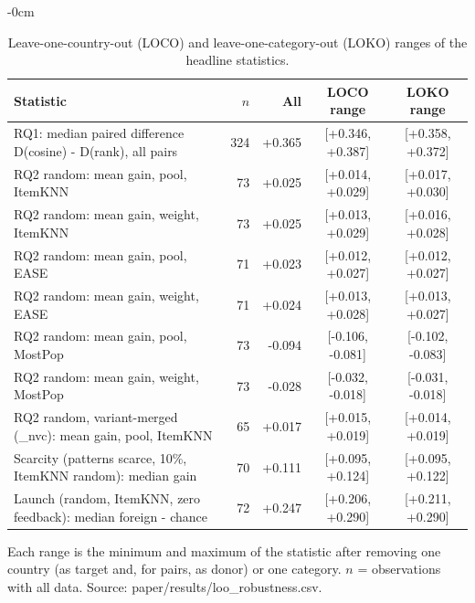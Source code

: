 \begin{table}[H]
\footnotesize
\caption{Leave-one-country-out (LOCO) and leave-one-category-out (LOKO) ranges of the headline statistics.\label{tab:loo}}
\begin{adjustwidth}{-\extralength}{0cm}
\centering
\begin{tabular}{>{\raggedright\arraybackslash}p{6.2cm}rrcc}
\toprule
Statistic & $n$ & All & LOCO range & LOKO range \\
\midrule
RQ1: median paired difference D(cosine) - D(rank), all pairs & 324 & +0.365 & [+0.346, +0.387] & [+0.358, +0.372] \\
RQ2 random: mean gain, pool, ItemKNN & 73 & +0.025 & [+0.014, +0.029] & [+0.017, +0.030] \\
RQ2 random: mean gain, weight, ItemKNN & 73 & +0.025 & [+0.013, +0.029] & [+0.016, +0.028] \\
RQ2 random: mean gain, pool, EASE & 71 & +0.023 & [+0.012, +0.027] & [+0.012, +0.027] \\
RQ2 random: mean gain, weight, EASE & 71 & +0.024 & [+0.013, +0.028] & [+0.013, +0.027] \\
RQ2 random: mean gain, pool, MostPop & 73 & -0.094 & [-0.106, -0.081] & [-0.102, -0.083] \\
RQ2 random: mean gain, weight, MostPop & 73 & -0.028 & [-0.032, -0.018] & [-0.031, -0.018] \\
RQ2 random, variant-merged (\_nvc): mean gain, pool, ItemKNN & 65 & +0.017 & [+0.015, +0.019] & [+0.014, +0.019] \\
Scarcity (patterns scarce, 10\%, ItemKNN random): median gain & 70 & +0.111 & [+0.095, +0.124] & [+0.095, +0.122] \\
Launch (random, ItemKNN, zero feedback): median foreign - chance & 72 & +0.247 & [+0.206, +0.290] & [+0.211, +0.290] \\
\bottomrule
\end{tabular}
\end{adjustwidth}
\par\footnotesize Each range is the minimum and maximum of the statistic after removing one country (as target and, for pairs, as donor) or one category. $n$ = observations with all data. Source: paper/results/loo\_robustness.csv.
\end{table}

